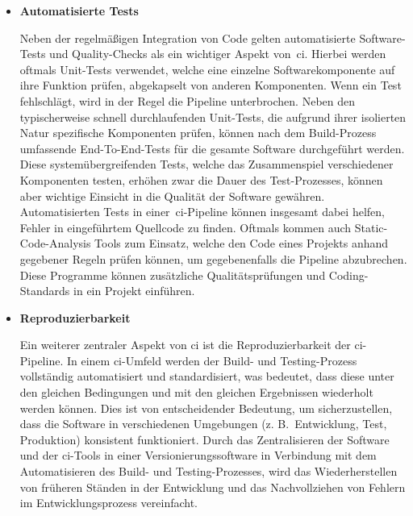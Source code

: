 \begin{itemize}
    \item {
        \textbf{Automatisierte Tests}\par
        Neben der regelmäßigen Integration von Code gelten automatisierte Software-Tests und Quality-Checks als ein
        wichtiger Aspekt von\ \acrshort{ci}.
        Hierbei werden oftmals Unit-Tests verwendet, welche eine einzelne Softwarekomponente auf
        ihre Funktion prüfen, abgekapselt von anderen Komponenten.
        Wenn ein Test fehlschlägt, wird in der Regel die Pipeline unterbrochen.
        Neben den typischerweise schnell durchlaufenden Unit-Tests, die aufgrund ihrer isolierten Natur spezifische
        Komponenten prüfen, können nach dem Build-Prozess umfassende End-To-End-Tests für die gesamte Software
        durchgeführt werden.
        Diese systemübergreifenden Tests, welche das Zusammenspiel verschiedener Komponenten testen, erhöhen zwar die
        Dauer des Test-Prozesses, können aber wichtige Einsicht in die Qualität der Software gewähren.
        Automatisierten Tests in einer\ \acrshort{ci}-Pipeline können insgesamt dabei helfen, Fehler in eingeführtem
        Quellcode zu finden.
        Oftmals kommen auch Static-Code-Analysis Tools zum Einsatz, welche den Code eines Projekts anhand gegebener
        Regeln prüfen können, um gegebenenfalls die Pipeline abzubrechen.
        Diese Programme können zusätzliche Qualitätsprüfungen und Coding-Standards in ein Projekt einführen.
    }

    \item {
        \textbf{Reproduzierbarkeit}\par
        Ein weiterer zentraler Aspekt von \acrlong{ci} ist die Reproduzierbarkeit der \acrshort{ci}-Pipeline.
        In einem \acrshort{ci}-Umfeld werden der Build- und Testing-Prozess vollständig automatisiert und
        standardisiert, was bedeutet, dass diese unter den gleichen Bedingungen und mit den gleichen Ergebnissen
        wiederholt werden können.
        Dies ist von entscheidender Bedeutung, um sicherzustellen, dass die Software in verschiedenen Umgebungen
        (z. B.\ Entwicklung, Test, Produktion) konsistent funktioniert.
        Durch das Zentralisieren der Software und der \acrshort{ci}-Tools in einer Versionierungssoftware in
        Verbindung mit dem Automatisieren des Build- und Testing-Prozesses, wird das Wiederherstellen von früheren
        Ständen in der Entwicklung und das Nachvollziehen von Fehlern im Entwicklungsprozess vereinfacht.
    }


\end{itemize}
